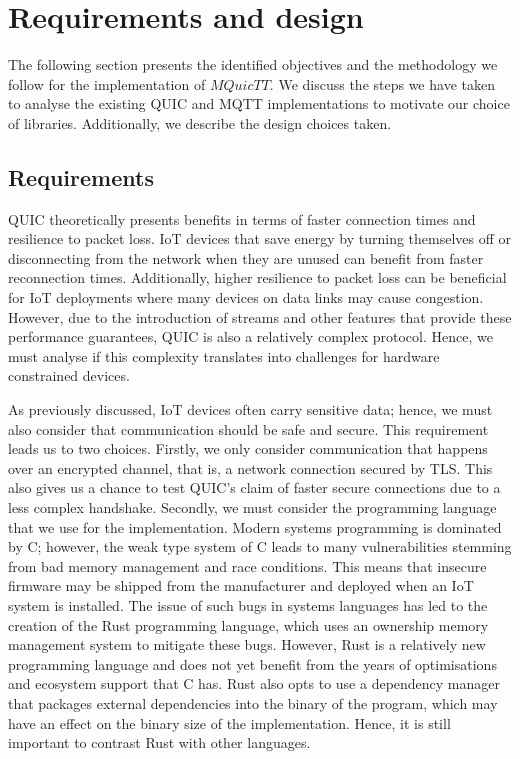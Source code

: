 \chapter{Requirements and design} \label{chap:reqs}

The following section presents the identified objectives and the methodology we follow for the implementation of $MQuicTT$.
We discuss the steps we have taken to analyse the existing QUIC and MQTT implementations to motivate our choice of libraries.
Additionally, we describe the design choices taken.

\section{Requirements}

QUIC theoretically presents benefits in terms of faster connection times and resilience to packet loss.
IoT devices that save energy by turning themselves off or disconnecting from the network when they are unused can benefit from faster reconnection times.
Additionally, higher resilience to packet loss can be beneficial for IoT deployments where many devices on data links may cause congestion.
However, due to the introduction of streams and other features that provide these performance guarantees, QUIC is also a relatively complex protocol.
Hence, we must analyse if this complexity translates into challenges for hardware constrained devices.

As previously discussed, IoT devices often carry sensitive data; hence, we must also consider that communication should be safe and secure.
This requirement leads us to two choices.
Firstly, we only consider communication that happens over an encrypted channel, that is, a network connection secured by TLS.
This also gives us a chance to test QUIC's claim of faster secure connections due to a less complex handshake.
Secondly, we must consider the programming language that we use for the implementation.
Modern systems programming is dominated by C; however, the weak type system of C leads to many vulnerabilities stemming from bad memory management and race conditions.
This means that insecure firmware may be shipped from the manufacturer and deployed when an IoT system is installed.
The issue of such bugs in systems languages has led to the creation of the Rust programming language, which uses an ownership memory management system to mitigate these bugs.
However, Rust is a relatively new programming language and does not yet benefit from the years of optimisations and ecosystem support that C has.
Rust also opts to use a dependency manager that packages external dependencies into the binary of the program, which may have an effect on the binary size of the implementation.
Hence, it is still important to contrast Rust with other languages.

